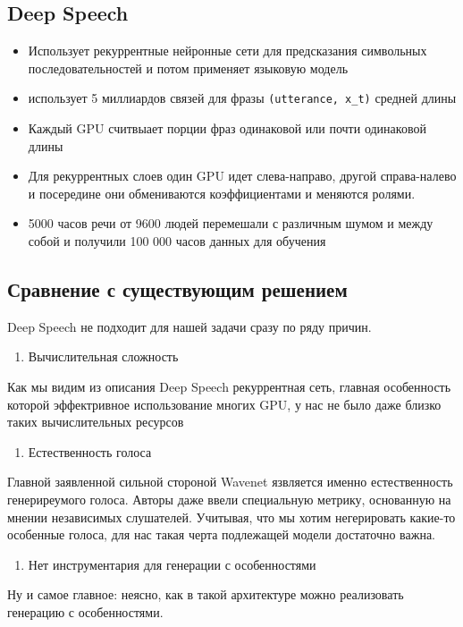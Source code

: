 \documentclass[../diploma.tex]{subfiles}
\begin{document}
\subsection{Deep Speech}
\begin{itemize}
    \item Использует рекуррентные нейронные сети для предсказания символьных последовательностей и потом применяет языковую модель
    \item использует 5 миллиардов связей для фразы \verb|(utterance, x_t)| средней длины
    \item Каждый GPU считвыает порции фраз одинаковой или почти одинаковой длины
    \item Для рекуррентных слоев один GPU идет слева-направо, другой справа-налево и посередине они обмениваются коэффициентами и меняются ролями.
    \item 5000 часов речи от 9600 людей перемешали с различным шумом и между собой и получили 100 000 часов данных для обучения
\end{itemize}
\cite{article:hannun2014deep}


\subsection{Сравнение с существующим решением}

Deep Speech не подходит для нашей задачи сразу по ряду причин.
\begin{enumerate}
    \item Вычислительная сложность
\end{enumerate}
Как мы видим из описания Deep Speech рекуррентная сеть, главная особенность которой эффектривное использование многих GPU, у нас не было даже близко таких вычислительных ресурсов 
\begin{enumerate}[resume]
    \item Естественность голоса
\end{enumerate}
Главной заявленной сильной стороной Wavenet язвляется именно естественность генериреумого голоса. Авторы даже ввели специальную метрику, основанную на мнении независимых слушателей. Учитывая, что мы хотим негерировать какие-то особенные голоса, для нас такая черта подлежащей модели достаточно важна.

\begin{enumerate}[resume]
    \item Нет инструментария для генерации с особенностями
\end{enumerate}
Ну и самое главное: неясно, как в такой архитектуре можно реализовать генерацию с особенностями. 



\end{document}
